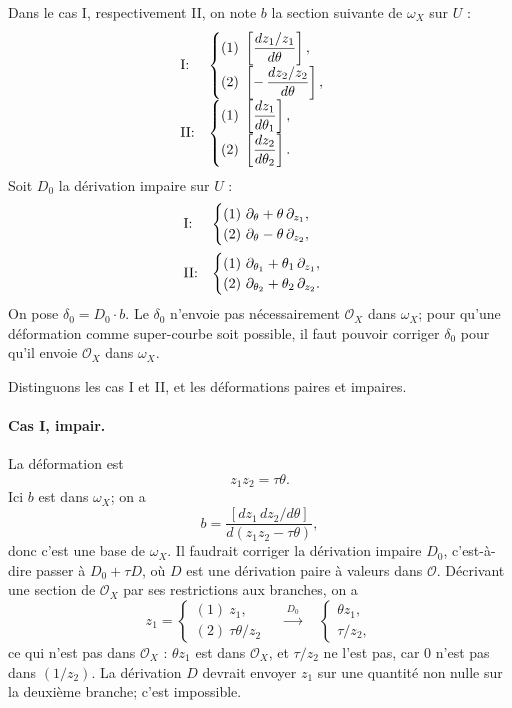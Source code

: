 \documentclass[11pt]{article}
\newcommand{\OO}{\mathcal O}
\begin{document}
Dans le cas I, respectivement II, on note $b$ la section suivante de $\omega_X$ sur $U$ :
\[
\begin{array}{ll}
\text{\rm I:}&
\begin{cases}
(1)\ \left[\dfrac{dz_1/z_1}{d\theta}\right],\\[2mm]
(2)\ \left[-\,\dfrac{dz_2/z_2}{d\theta}\right],
\end{cases}
\\[6mm]
\text{\rm II:}&
\begin{cases}
(1)\ \left[\dfrac{dz_1}{d\theta_1}\right],\\[2mm]
(2)\ \left[\dfrac{dz_2}{d\theta_2}\right].
\end{cases}
\end{array}
\]
Soit $D_0$ la dérivation impaire sur $U$ :
\[
\begin{array}{ll}
\text{\rm I:}&
\begin{cases}
(1)\ \partial_\theta+\theta\,\partial_{z_1},\\
(2)\ \partial_\theta-\theta\,\partial_{z_2},
\end{cases}
\\[5mm]
\text{\rm II:}&
\begin{cases}
(1)\ \partial_{\theta_1}+\theta_1\,\partial_{z_1},\\
(2)\ \partial_{\theta_2}+\theta_2\,\partial_{z_2}.
\end{cases}
\end{array}
\]
On pose $\delta_0=D_0\cdot b$. Le $\delta_0$ n'envoie pas nécessairement $\OO_X$ dans $\omega_X$; pour qu'une déformation comme super-courbe soit possible, il faut pouvoir corriger $\delta_0$ pour qu'il envoie $\OO_X$ dans $\omega_X$.

Distinguons les cas I et II, et les déformations paires et impaires.

\paragraph{Cas I, impair.}
La déformation est
\[
  z_1z_2=\tau\theta .
\]
Ici $b$ est dans $\omega_X$; on a
\[
  b=\frac{\left[dz_1\,dz_2/d\theta\right]}{d(z_1z_2-\tau\theta)},
\]
donc c'est une base de $\omega_X$. Il faudrait corriger la dérivation impaire $D_0$, c'est-à-dire passer à $D_0+\tau D$, où $D$ est une dérivation paire à valeurs dans $\OO$. Décrivant une section de $\OO_X$ par ses restrictions aux branches, on a
\[
z_1=
\begin{cases}
(1)\ z_1,\\
(2)\ \tau\theta/z_2
\end{cases}
\quad \xrightarrow{\ D_0\ }\quad
\begin{cases}
\theta z_1,\\
\tau/z_2 ,
\end{cases}
\]
ce qui n'est pas dans $\OO_X$ : $\theta z_1$ est dans $\OO_X$, et $\tau/z_2$ ne l'est pas, car $0$ n'est pas dans $(1/z_2)$. La dérivation $D$ devrait envoyer $z_1$ sur une quantité non nulle sur la deuxième branche; c'est impossible.
\end{document}
